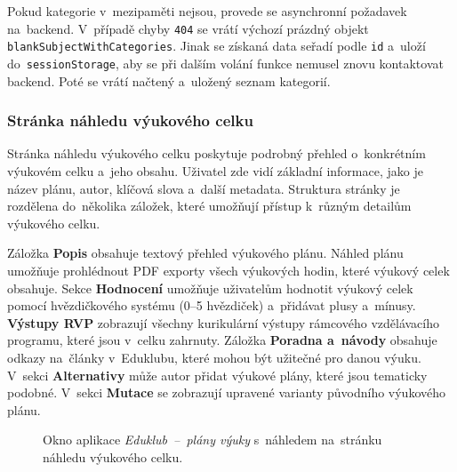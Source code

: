 \documentclass[male,czech,api_bc]{kitheses}
\begin{document}
Pokud kategorie v~mezipaměti nejsou, provede se asynchronní požadavek na~backend. V~případě chyby \texttt{404} se vrátí výchozí prázdný objekt \texttt{blankSubjectWithCategories}. Jinak se získaná data seřadí podle \texttt{id} a~uloží do~\texttt{sessionStorage}, aby se při dalším volání funkce nemusel znovu kontaktovat backend. Poté se vrátí načtený a~uložený seznam kategorií.

\subsubsection{Stránka náhledu výukového celku}

Stránka náhledu výukového celku poskytuje podrobný přehled o~konkrétním výukovém celku a~jeho obsahu. Uživatel zde vidí základní informace, jako je název plánu, autor, klíčová slova a~další metadata. Struktura stránky je rozdělena do~několika záložek, které umožňují přístup k~různým detailům výukového celku.

Záložka \textbf{Popis} obsahuje textový přehled výukového plánu. Náhled plánu umožňuje prohlédnout PDF exporty všech výukových hodin, které výukový celek obsahuje. Sekce \textbf{Hodnocení} umožňuje uživatelům hodnotit výukový celek pomocí hvězdičkového systému (0--5 hvězdiček) a~přidávat plusy a~mínusy. \textbf{Výstupy RVP} zobrazují všechny kurikulární výstupy rámcového vzdělávacího programu, které jsou v~celku zahrnuty. Záložka \textbf{Poradna a~návody} obsahuje odkazy na~články v~Eduklubu, které mohou být užitečné pro danou výuku. V~sekci \textbf{Alternativy} může autor přidat výukové plány, které jsou tematicky podobné. V~sekci \textbf{Mutace} se zobrazují upravené varianty původního výukového plánu.

\begin{figure}[H]
	\centering
	\caption{Okno aplikace \textit{Eduklub~--~plány výuky} s~náhledem na~stránku náhledu výukového celku.}
	\label{fig:eduklub-4}
\end{figure}
\end{document}
